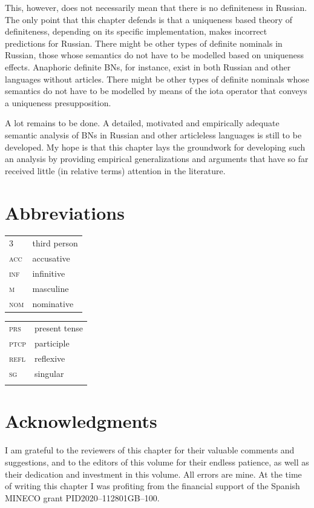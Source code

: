 \documentclass[output=paper,colorlinks,citecolor=brown]{langscibook}
\begin{document}
This, however, does not necessarily mean that there is no definiteness in Russian. The only point that this chapter defends is that a uniqueness based theory of definiteness, depending on its specific implementation, makes incorrect predictions for Russian. There might be other types of definite nominals in Russian, those whose semantics do not have to be modelled based on uniqueness effects. Anaphoric definite BNs, for instance, exist in both Russian and other languages without articles. There might be other types of definite nominals whose semantics do not have to be modelled by means of the iota operator that conveys a uniqueness presupposition. 

A lot remains to be done. A detailed, motivated and empirically adequate semantic analysis of BNs in Russian and other articleless languages is still to be developed. My hope is that this chapter lays the groundwork for developing such an analysis by providing empirical generalizations and arguments that have so far received little (in relative terms) attention in the literature. 


\section*{Abbreviations}

\begin{tabularx}{.5\textwidth}{@{}lQ}
\textsc{3}&third person\\
\textsc{acc}&accusative\\
\textsc{inf}&infinitive\\
\textsc{m}&masculine\\
\textsc{nom}&nominative\\
\end{tabularx}%
\begin{tabularx}{.5\textwidth}{lQ@{}}
\textsc{prs}&present tense\\
\textsc{ptcp}&participle\\
\textsc{refl}&reflexive\\
\textsc{sg}&singular\\
&\\ %
\end{tabularx}

\section*{Acknowledgments}
I am grateful to the reviewers of this chapter for their valuable comments and suggestions, and to the editors of this volume for their endless patience, as well as their dedication and investment in this volume. All errors are mine. At the time of writing this chapter I was profiting from the financial support of the Spanish MINECO grant
PID2020–112801GB–100. 



{\sloppy\printbibliography[heading=subbibliography,notkeyword=this]}
\end{document}
